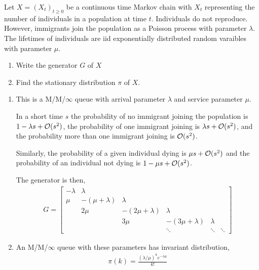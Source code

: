 \begin{problem}
Let \( X = (X_t)_{t\geq 0} \) be a continuous time Markov chain with \( X_t \) representing the number of individuals in a population at time \( t \). Individuals do not reproduce. However, immigrants join the population as a Poisson process with parameter \( \lambda \). The lifetimes of individuals are iid exponentially distributed random varaibles with parameter \( \mu \).
\begin{enumerate}[nolistsep,label=(\alph*)]
    \item Write the generator \( G \) of \( X \)
    \item Find the stationary distribution \( \pi \) of \( X \).
\end{enumerate}
\end{problem}

\begin{solution}[Solution]
\begin{enumerate}[label=(\alph*)]
    \item
        This is a M/M/\(\infty\) queue with arrival parameter \( \lambda \) and service parameter \( \mu \).
        
        In a short time \( s\) the probability of no immigrant joining the population is \( 1-\lambda s + \mathcal{O}(s^2) \), the probability of one immigrant joining is \( \lambda s + \mathcal{O}(s^2) \), and the probability more than one immigrant joining is \( \mathcal{O}(s^2) \).

        Similarly, the probability of a given individual dying is \( \mu s + \mathcal{O}(s^2) \) and the probability of an individual not dying is \( 1-\mu s + \mathcal{O}(s^2) \). 

        The generator is then,
        \begin{align*}
            G = \left[\begin{array}{ccccccc}
            -\lambda & \lambda \\
            \mu & -(\mu+\lambda) & \lambda \\
            & 2\mu & - (2\mu+\lambda) & \lambda \\
            && 3\mu & -(3\mu+\lambda) & \lambda \\
                &&&\ddots&\ddots&\ddots 
            \end{array}\right]
        \end{align*}
       
       \item 
        An M/M/\(\infty\) queue with these parameters has invariant distribution,
        \begin{align*}
            \pi(k) = \frac{(\lambda/\mu)^k e^{-\lambda\mu}}{k!}
        \end{align*}
\end{enumerate}
\end{solution}


